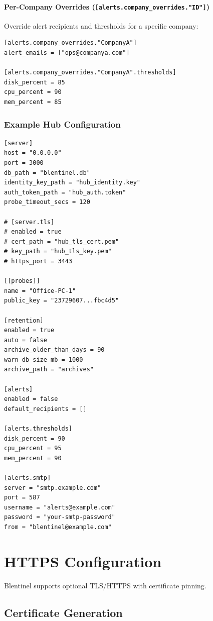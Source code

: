 \documentclass[12pt]{report}
\begin{document}
\paragraph{Per-Company Overrides (\texttt{[alerts.company\_overrides."ID"]})}

Override alert recipients and thresholds for a specific company:

\begin{lstlisting}
[alerts.company_overrides."CompanyA"]
alert_emails = ["ops@companya.com"]

[alerts.company_overrides."CompanyA".thresholds]
disk_percent = 85
cpu_percent = 90
mem_percent = 85
\end{lstlisting}

\subsubsection{Example Hub Configuration}

\begin{lstlisting}
[server]
host = "0.0.0.0"
port = 3000
db_path = "blentinel.db"
identity_key_path = "hub_identity.key"
auth_token_path = "hub_auth.token"
probe_timeout_secs = 120

# [server.tls]
# enabled = true
# cert_path = "hub_tls_cert.pem"
# key_path = "hub_tls_key.pem"
# https_port = 3443

[[probes]]
name = "Office-PC-1"
public_key = "23729607...fbc4d5"

[retention]
enabled = true
auto = false
archive_older_than_days = 90
warn_db_size_mb = 1000
archive_path = "archives"

[alerts]
enabled = false
default_recipients = []

[alerts.thresholds]
disk_percent = 90
cpu_percent = 95
mem_percent = 90

[alerts.smtp]
server = "smtp.example.com"
port = 587
username = "alerts@example.com"
password = "your-smtp-password"
from = "blentinel@example.com"
\end{lstlisting}

\section{HTTPS Configuration}

Blentinel supports optional TLS/HTTPS with certificate pinning.

\subsection{Certificate Generation}
\end{document}
